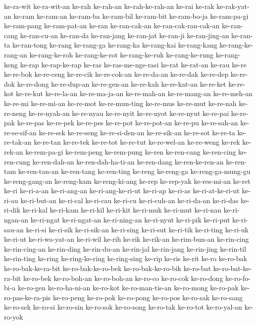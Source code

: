{ke-ra-wit ke-ra-wit-an ke-rah ke-rah-an ke-rah-ke-rah-an ke-rai ke-rak
ke-rak-yat-an ke-ram ke-ram-an ke-ram-ba ke-ram-bil ke-ram-bit
ke-ram-bo-ja ke-ram-pa-gi ke-ram-pang ke-ram-pat-an ke-ran ke-ran-cak-an
ke-ran-cak-ran-cak-an ke-ran-cang ke-ran-cu-an ke-ran-da ke-ran-jang
ke-ran-jat ke-ran-ji ke-ran-jing-an ke-ran-ta ke-ran-tong ke-rang
ke-rang-ga ke-rang-ka ke-rang-kai ke-rang-kang ke-rang-ke-rang-an
ke-rang-ke-roh ke-rang-ke-rot ke-rang-ke-ruk ke-rang-ke-rung ke-rang-keng
ke-rap ke-rap-ke-rap ke-ras ke-ras-me-nge-rasi ke-rat ke-rat-an ke-rau
ke-re ke-re-bok ke-re-ceng ke-re-cik ke-re-cok-an ke-re-da-an ke-re-dak
ke-re-dep ke-re-dok ke-re-dong ke-re-dup-an ke-re-gen-an ke-re-kah
ke-re-kat-an ke-re-ket ke-re-kot ke-re-kut ke-re-la-an ke-re-ma-ja-an
ke-re-mah-an ke-re-mang-an ke-re-meh-an ke-re-mi ke-re-mi-an ke-re-mot
ke-re-mun-ting ke-re-mus ke-re-mut ke-re-nah ke-re-neng ke-re-nyah-an
ke-re-nyau ke-re-nyit ke-re-nyot ke-re-nyut ke-re-pai ke-re-pak ke-re-pas
ke-re-pek ke-re-pes ke-re-pot ke-re-pot-an ke-re-pu ke-re-sah-an
ke-re-se-sif-an ke-re-sek ke-re-seng ke-re-si-den-an ke-re-sik-an
ke-re-sot ke-re-ta ke-re-tak-an ke-re-tan ke-re-tek ke-re-tot ke-re-tut
ke-re-wel-an ke-re-weng ke-rek ke-rek-an ke-rem-pa-gi ke-rem-peng
ke-rem-pung ke-ren ke-ren-cang ke-ren-cing ke-ren-cung ke-ren-dah-an
ke-ren-dah-ha-ti-an ke-ren-dang ke-ren-ke-ren-an ke-ren-tam ke-ren-tan-an
ke-ren-tang ke-ren-ting ke-reng ke-reng-ga ke-reng-ga-mung-gu
ke-reng-gang-an ke-reng-kam ke-reng-ki-ang ke-rep ke-rep-yak ke-res-mi-an
ke-ret ke-ri ke-ri-a-an ke-ri-ang-an ke-ri-ang-ke-ri-ut ke-ri-ap ke-ri-as
ke-ri-at-ke-ri-ut ke-ri-au ke-ri-but-an ke-ri-cal ke-ri-cau ke-ri-cu
ke-ri-cuh-an ke-ri-da-an ke-ri-das ke-ri-dik ke-ri-kal ke-ri-kam ke-ri-kil
ke-ri-kit ke-ri-muk ke-ri-mut ke-ri-nan ke-ri-ngan-an ke-ri-ngat
ke-ri-ngat-an ke-ri-ning-an ke-ri-nyut ke-ri-pik ke-ri-put ke-ri-sau-an
ke-ri-si ke-ri-sik ke-ri-sik-an ke-ri-sing ke-ri-sut ke-ri-tik ke-ri-ting
ke-ri-uk ke-ri-ut ke-ri-wa-yat-an ke-ri-wil ke-rih ke-rik ke-rik-an
ke-rim-bun-an ke-rin-cing ke-rin-cing-an ke-rin-ding ke-rin-du-an
ke-rin-jal ke-rin-jang ke-rin-jing ke-rin-til ke-rin-ting ke-ring
ke-ring-ke-ring ke-ring-sing ke-rip ke-ris ke-rit ke-ro ke-ro-bak
ke-ro-bak-ke-ra-bit ke-ro-bak-ke-ro-bek ke-ro-bak-ke-ro-bik ke-ro-bat
ke-ro-bat-ke-ra-bit ke-ro-bek ke-ro-boh-an ke-ro-boh-an ke-ro-co ke-ro-cok
ke-ro-dong ke-ro-fo-bi-a ke-ro-gen ke-ro-ha-ni-an ke-ro-kot
ke-ro-man-tis-an ke-ro-mong ke-ro-pak ke-ro-pas-ke-ra-pis ke-ro-peng
ke-ro-pok ke-ro-pong ke-ro-pos ke-ro-sak ke-ro-sang ke-ro-sek ke-ro-si
ke-ro-sin ke-ro-sok ke-ro-song ke-ro-tak ke-ro-tot ke-ro-yal-an ke-ro-yok
}
